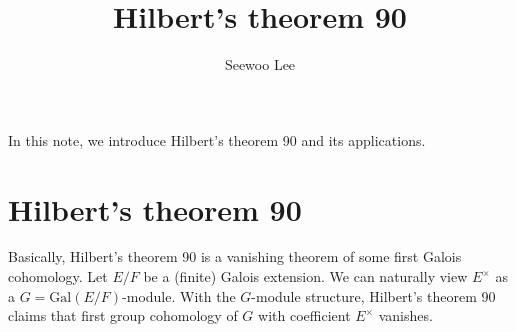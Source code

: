 \documentclass{article}
\title{Hilbert's theorem 90}
\author{Seewoo Lee}
\newcommand{\Gal}{\mathrm{Gal}}
\begin{document}
\maketitle

In this note, we introduce Hilbert's theorem 90 and its applications. 
\section{Hilbert's theorem 90}

Basically, Hilbert's theorem 90 is a vanishing theorem of some first Galois cohomology. 
Let $E/F$ be a (finite) Galois extension. We can naturally view $E^{\times}$ as a $G = \Gal(E/F)$-module. 
With the $G$-module structure, Hilbert's theorem 90 claims that first group cohomology of $G$ with coefficient $E^{\times}$ vanishes.  
\end{document}

